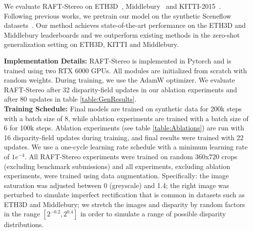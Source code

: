 \documentclass[10pt,twocolumn,letterpaper]{article}
\begin{document}
We evaluate RAFT-Stereo on ETH3D~\cite{eth3d}, Middlebury~\cite{middlebury} and KITTI-2015~\cite{kitti}. Following previous works, we pretrain our model on the synthetic Sceneflow datasets~\cite{sceneflow}. Our method achieves state-of-the-art performance on the ETH3D and Middlebury leaderboards and we outperform existing methods in the zero-shot generalization setting on ETH3D, KITTI and Middlebury. 

\vspace{1mm}
\noindent\textbf{Implementation Details:} RAFT-Stereo is implemented in Pytorch \cite{pytorch} and is trained using two RTX 6000 GPUs. All modules are initialized from scratch with random weights. During training, we use the AdamW \cite{adamw} optimizer. We evaluate RAFT-Stereo after 32 disparity-field updates in our ablation experiments and after 80 updates in table \ref{table:GenResults}. \smallskip\\
\noindent\textbf{Training Schedule:} Final models are trained on synthetic data for 200k steps with a batch size of 8, while ablation experiments are trained with a batch size of 6 for 100k steps. Ablation experiments (see table \ref{table:Ablations}) are run with 16 disparity-field updates during training, and final results were trained with 22 updates. We use a one-cycle learning rate schedule \cite{smith2018superconvergence} with a minimum learning rate of $1e^{-4}$. All RAFT-Stereo experiments were trained on random $360$x$720$ crops (excluding benchmark submissions) and all experiments, excluding ablation experiments, were trained using data augmentation. Specifically: the image saturation was adjusted between 0 (greyscale) and 1.4; the right image was perturbed to simulate imperfect rectification that is common in datasets such as ETH3D and Middlebury; we stretch the images and disparity by random factors in the range $[2^{-0.2}, 2^{0.4}]$ in order to simulate a range of possible disparity distributions. 
\end{document}
